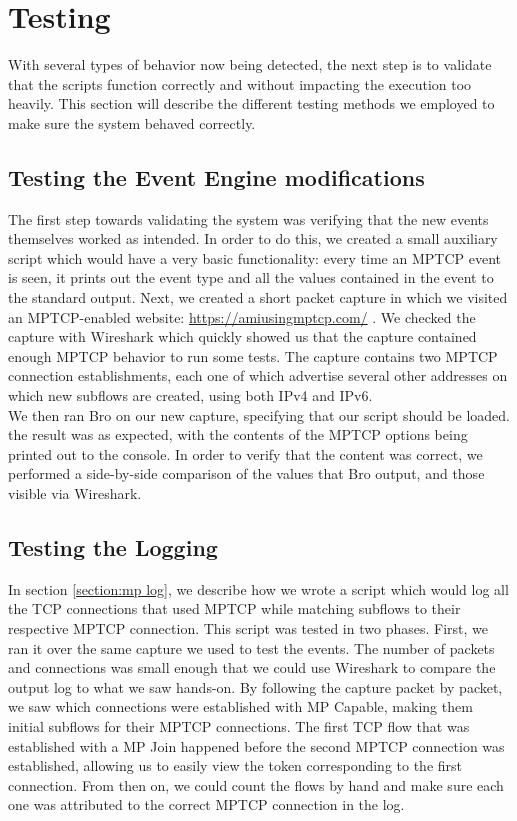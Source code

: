

\chapter{Testing} \label{chap:test}
With several types of behavior now being detected, the next step is to validate that the scripts function correctly and without impacting the execution too heavily. This section will describe the different testing methods we employed to make sure the system behaved correctly.

\section{Testing the Event Engine modifications}
The first step towards validating the system was verifying that the new events themselves worked as intended. In order to do this, we created a small auxiliary script which would have a very basic functionality: every time an MPTCP event is seen, it prints out the event type and all the values contained in the event to the standard output. Next, we created a short packet capture in which we visited an MPTCP-enabled website: \url {https://amiusingmptcp.com/} \cite{amiusing}. We checked the capture with Wireshark \citep{wireshark} which quickly showed us that the capture contained enough MPTCP behavior to run some tests. The capture contains two MPTCP connection establishments, each one of which advertise several other addresses on which new subflows are created, using both IPv4 and IPv6. \\

We then ran Bro on our new capture, specifying that our script should be loaded. the result was as expected, with the contents of the MPTCP options being printed out to the console. In order to verify that the content was correct, we performed a side-by-side comparison of the values that Bro output, and those visible via Wireshark.

\section{Testing the Logging}
In section \ref{section:mp log}, we describe how we wrote a script which would log all the TCP connections that used MPTCP while matching subflows to their respective MPTCP connection. This script was tested in two phases. First, we ran it over the same capture we used to test the events. The number of packets and connections was small enough that we could use Wireshark to compare the output log to what we saw hands-on. By following the capture packet by packet, we saw which connections were established with MP Capable, making them initial subflows for their MPTCP connections. The first TCP flow that was established with a MP Join happened before the second MPTCP connection was established, allowing us to easily view the token corresponding to the first connection. From then on, we could count the flows by hand and make sure each one was attributed to the correct MPTCP connection in the log. \\

